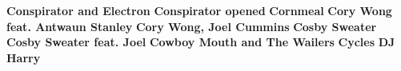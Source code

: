 \noindent \textbf{Conspirator and Electron}\newline
\vspace{10pt} 
\newline
\vspace{10pt} 
\noindent \textbf{Conspirator opened}\newline
\vspace{10pt} 
\newline
\vspace{10pt} 
\noindent \textbf{Cornmeal}\newline
\vspace{10pt} 
\newline
\vspace{10pt} 
\noindent \textbf{Cory Wong feat. Antwaun Stanley}\newline
\vspace{10pt} 
\newline
\vspace{10pt} 
\noindent \textbf{Cory Wong, Joel Cummins}\newline
\vspace{10pt} 
\newline
\vspace{10pt} 
\noindent \textbf{Cosby Sweater}\newline
\vspace{10pt} 
\newline
\vspace{10pt} 
\noindent \textbf{Cosby Sweater feat. Joel}\newline
\vspace{10pt} 
\newline
\vspace{10pt} 
\noindent \textbf{Cowboy Mouth and The Wailers}\newline
\vspace{10pt} 
\newline
\vspace{10pt} 
\noindent \textbf{Cycles}\newline
\vspace{10pt} 
\newline
\vspace{10pt} 
\noindent \textbf{DJ Harry}\newline
